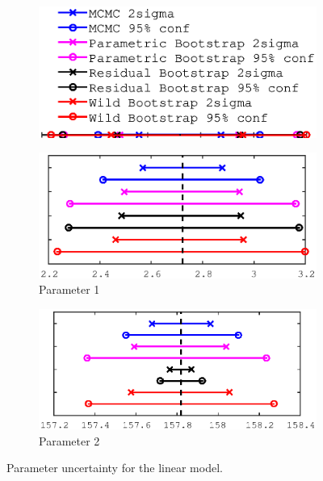 \documentclass[11pt,a4paper,oneside]{report}
\begin{document}
\begin{figure}[H]
   \centering
    \begin{subfigure}[b]{0.4\textwidth}
    \includegraphics[width=\textwidth, trim=0 15 0 0,clip=true]{figures/task5/uncert_legend.eps}
  \end{subfigure}%

  \begin{subfigure}[b]{0.5\textwidth}
    \includegraphics[width=\textwidth, trim=0 0 0 0,clip=true]{figures/task5/uncert_model1_param1.eps}
    \caption{Parameter 1}
  \end{subfigure}%
  \begin{subfigure}[b]{0.5\textwidth}
    \includegraphics[width=\textwidth, trim=0 0 0 0,clip=true]{figures/task5/uncert_model1_param2.eps}
    \caption{Parameter 2}
  \end{subfigure}%
  
  \caption{Parameter uncertainty for the linear model.}
  \label{fig:c5uncertM1}
  
\end{figure}
\end{document}
